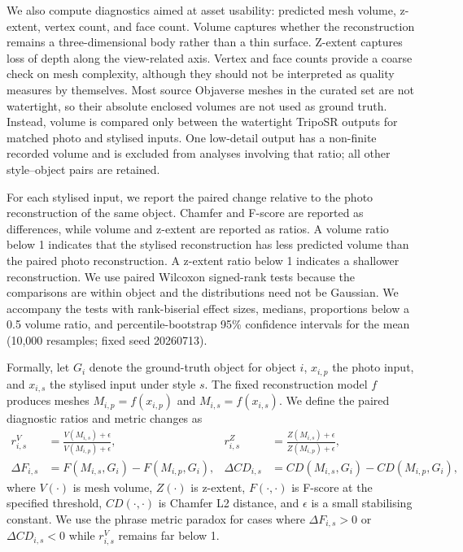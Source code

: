 \documentclass[12pt,a4paper]{article}
\begin{document}
We also compute diagnostics aimed at asset usability: predicted mesh volume, z-extent, vertex count, and face count. Volume captures whether the reconstruction remains a three-dimensional body rather than a thin surface. Z-extent captures loss of depth along the view-related axis. Vertex and face counts provide a coarse check on mesh complexity, although they should not be interpreted as quality measures by themselves. Most source Objaverse meshes in the curated set are not watertight, so their absolute enclosed volumes are not used as ground truth. Instead, volume is compared only between the watertight TripoSR outputs for matched photo and stylised inputs. One low-detail output has a non-finite recorded volume and is excluded from analyses involving that ratio; all other style--object pairs are retained.

For each stylised input, we report the paired change relative to the photo reconstruction of the same object. Chamfer and F-score are reported as differences, while volume and z-extent are reported as ratios. A volume ratio below 1 indicates that the stylised reconstruction has less predicted volume than the paired photo reconstruction. A z-extent ratio below 1 indicates a shallower reconstruction. We use paired Wilcoxon signed-rank tests because the comparisons are within object and the distributions need not be Gaussian. We accompany the tests with rank-biserial effect sizes, medians, proportions below a 0.5 volume ratio, and percentile-bootstrap 95\% confidence intervals for the mean (10,000 resamples; fixed seed 20260713).

Formally, let $G_i$ denote the ground-truth object for object $i$, $x_{i,p}$ the photo input, and $x_{i,s}$ the stylised input under style $s$. The fixed reconstruction model $f$ produces meshes $M_{i,p}=f(x_{i,p})$ and $M_{i,s}=f(x_{i,s})$. We define the paired diagnostic ratios and metric changes as
\begin{align}
r^{V}_{i,s} &= \frac{V(M_{i,s})+\epsilon}{V(M_{i,p})+\epsilon}, &
r^{Z}_{i,s} &= \frac{Z(M_{i,s})+\epsilon}{Z(M_{i,p})+\epsilon}, \\
\Delta F_{i,s} &= F(M_{i,s},G_i)-F(M_{i,p},G_i), &
\Delta CD_{i,s} &= CD(M_{i,s},G_i)-CD(M_{i,p},G_i),
\end{align}
where $V(\cdot)$ is mesh volume, $Z(\cdot)$ is z-extent, $F(\cdot,\cdot)$ is F-score at the specified threshold, $CD(\cdot,\cdot)$ is Chamfer L2 distance, and $\epsilon$ is a small stabilising constant. We use the phrase metric paradox for cases where $\Delta F_{i,s}>0$ or $\Delta CD_{i,s}<0$ while $r^{V}_{i,s}$ remains far below 1.
\end{document}
